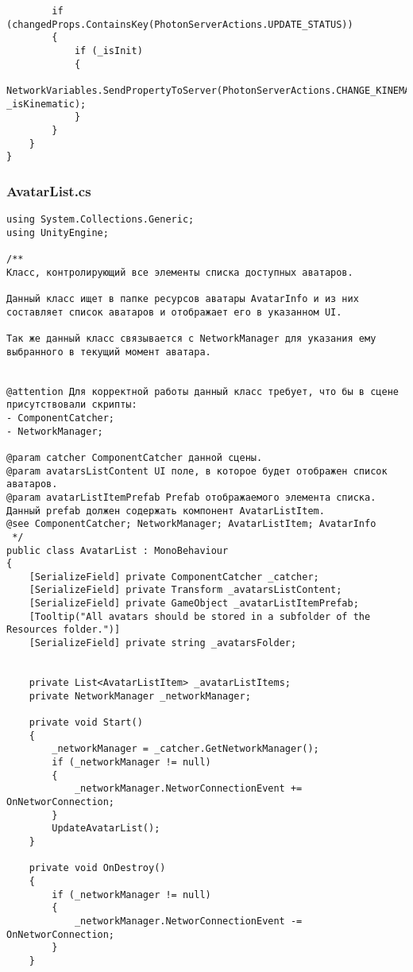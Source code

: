 \begin{verbatim}
        if (changedProps.ContainsKey(PhotonServerActions.UPDATE_STATUS))
        {
            if (_isInit)
            {
                NetworkVariables.SendPropertyToServer(PhotonServerActions.CHANGE_KINEMATIC, _isKinematic);
            }
        }
    }
}

\end{verbatim}
\subsubsection*{AvatarList.cs}
\begin{verbatim}
﻿using System.Collections.Generic;
using UnityEngine;

/**
Класс, контролирующий все элементы списка доступных аватаров.

Данный класс ищет в папке ресурсов аватары AvatarInfo и из них составляет список аватаров и отображает его в указанном UI.

Так же данный класс связывается с NetworkManager для указания ему выбранного в текущий момент аватара.


@attention Для корректной работы данный класс требует, что бы в сцене присутствовали скрипты:
- ComponentCatcher;
- NetworkManager;

@param catcher ComponentCatcher данной сцены.
@param avatarsListContent UI поле, в которое будет отображен список аватаров.
@param avatarListItemPrefab Prefab отображаемого элемента списка. Данный prefab должен содержать компонент AvatarListItem.
@see ComponentCatcher; NetworkManager; AvatarListItem; AvatarInfo
 */
public class AvatarList : MonoBehaviour
{
    [SerializeField] private ComponentCatcher _catcher;
    [SerializeField] private Transform _avatarsListContent;
    [SerializeField] private GameObject _avatarListItemPrefab;
    [Tooltip("All avatars should be stored in a subfolder of the Resources folder.")]
    [SerializeField] private string _avatarsFolder;


    private List<AvatarListItem> _avatarListItems;
    private NetworkManager _networkManager;

    private void Start()
    {
        _networkManager = _catcher.GetNetworkManager();
        if (_networkManager != null)
        {
            _networkManager.NetworConnectionEvent += OnNetworConnection;
        }
        UpdateAvatarList();
    }

    private void OnDestroy()
    {
        if (_networkManager != null)
        {
            _networkManager.NetworConnectionEvent -= OnNetworConnection;
        }
    }


\end{verbatim}
